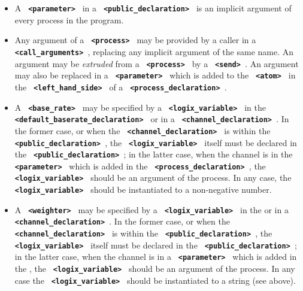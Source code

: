 \documentclass[twoside,10pt]{report}
\begin{document}
\begin{itemize}
\item
A {\bf \verb+ <parameter> +} in a {\bf \verb+ <public_declaration> +} is an
implicit argument of every process in the program.

\item
Any argument of a {\bf \verb+ <process> +} may be  provided by a caller in a
\linebreak
{\bf \verb+ <call_arguments> +}, replacing any implicit argument of the same
name. 
An argument  may be {\em extruded} from a {\bf \verb+ <process> +} by a
{\bf \verb+ <send> +}.  An argument
may also be replaced in a {\bf \verb+ <parameter> +} which is added to the
{\bf \verb+ <atom> +} in the {\bf \verb+ <left_hand_side> +} of a
{\bf \verb+ <process_declaration> +}.

\item
A {\bf \verb+ <base_rate> +} may be specified by a
{\bf \verb+ <logix_variable> +} in the \linebreak
{\bf \verb+ <default_baserate_declaration> +} or in a
{\bf \verb+ <channel_declaration> +}.  In the former case, or when the
{\bf \verb+ <channel_declaration> +} is within the
{\bf \verb+ <public_declaration> +},
the {\bf \verb+ <logix_variable> +} itself must be declared in the
{\bf \verb+ <public_declaration> +}; in the latter case, when the channel
is in the {\bf \verb+ <parameter> +} which is added in the \linebreak
{\bf \verb+ <process_declaration> +}, the {\bf \verb+ <logix_variable> +}
should be an argument of the process.  In any case, the
{\bf \verb+ <logix_variable> +}
should be instantiated to a non-negative number.

\item
A {\bf \verb+ <weighter> +} may be specified by a
{\bf \verb+ <logix_variable> +}
in the  or in a
{\bf \verb+ <channel_declaration> +}.  In the former case, or when the
{\bf \verb+ <channel_declaration> +} is within the
{\bf \verb+ <public_declaration> +}, 
the {\bf \verb+ <logix_variable> +} itself must be declared in the
{\bf \verb+ <public_declaration> +}; in the latter case, when the channel is in
a {\bf \verb+ <parameter> +} which is added in the 
, 
the {\bf \verb+ <logix_variable> +} should be an argument of the process.
In any case the {\bf \verb+ <logix_variable> +} should be instantiated to
a string (see above).


\end{itemize}
\end{document}
